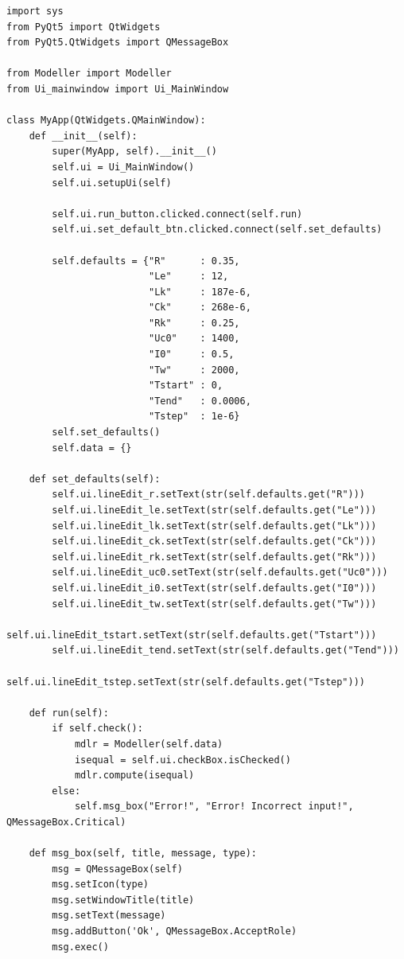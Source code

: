 \documentclass[a4paper,14pt]{article}
\begin{document}
\begin{lstlisting}[label=code1,caption=\text{Класс MyApp.}]
import sys
from PyQt5 import QtWidgets
from PyQt5.QtWidgets import QMessageBox

from Modeller import Modeller
from Ui_mainwindow import Ui_MainWindow

class MyApp(QtWidgets.QMainWindow):
    def __init__(self):
        super(MyApp, self).__init__()
        self.ui = Ui_MainWindow()
        self.ui.setupUi(self)

        self.ui.run_button.clicked.connect(self.run)
        self.ui.set_default_btn.clicked.connect(self.set_defaults)

        self.defaults = {"R"      : 0.35,
                         "Le"     : 12,
                         "Lk"     : 187e-6,
                         "Ck"     : 268e-6,
                         "Rk"     : 0.25,
                         "Uc0"    : 1400,
                         "I0"     : 0.5,
                         "Tw"     : 2000,
                         "Tstart" : 0,
                         "Tend"   : 0.0006,
                         "Tstep"  : 1e-6}
        self.set_defaults()
        self.data = {}

    def set_defaults(self):
        self.ui.lineEdit_r.setText(str(self.defaults.get("R")))
        self.ui.lineEdit_le.setText(str(self.defaults.get("Le")))
        self.ui.lineEdit_lk.setText(str(self.defaults.get("Lk")))
        self.ui.lineEdit_ck.setText(str(self.defaults.get("Ck")))
        self.ui.lineEdit_rk.setText(str(self.defaults.get("Rk")))
        self.ui.lineEdit_uc0.setText(str(self.defaults.get("Uc0")))
        self.ui.lineEdit_i0.setText(str(self.defaults.get("I0")))
        self.ui.lineEdit_tw.setText(str(self.defaults.get("Tw")))
        self.ui.lineEdit_tstart.setText(str(self.defaults.get("Tstart")))
        self.ui.lineEdit_tend.setText(str(self.defaults.get("Tend")))
        self.ui.lineEdit_tstep.setText(str(self.defaults.get("Tstep")))

    def run(self):
        if self.check():
            mdlr = Modeller(self.data)
            isequal = self.ui.checkBox.isChecked()
            mdlr.compute(isequal)
        else:
            self.msg_box("Error!", "Error! Incorrect input!", QMessageBox.Critical)
    
    def msg_box(self, title, message, type):
        msg = QMessageBox(self)
        msg.setIcon(type)
        msg.setWindowTitle(title)
        msg.setText(message)
        msg.addButton('Ok', QMessageBox.AcceptRole)
        msg.exec()


\end{lstlisting}
\end{document}

